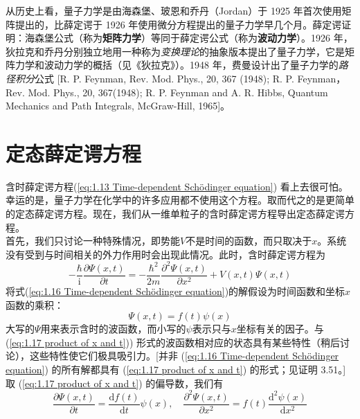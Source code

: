 	\indent 从历史上看，量子力学是由海森堡、玻恩和乔丹（Jordan）于 1925 年首次使用矩阵提出的，比薛定谔于 1926 年使用微分方程提出的量子力学早几个月。薛定谔证明：海森堡公式（称为\textbf{矩阵力学}）等同于薛定谔公式（称为\textbf{波动力学}）。1926 年，狄拉克和乔丹分别独立地用一种称为\textit{变换理论}的抽象版本提出了量子力学，它是矩阵力学和波动力学的概括（见《狄拉克》）。1948 年，费曼设计出了量子力学的\textit{路径积分}公式 [R. P. Feynman, Rev. Mod. Phys., 20, 367 (1948); R. P. Feynman，Rev. Mod. Phys., 20, 367(1948); R. P. Feynman and A. R. Hibbs, Quantum Mechanics and Path Integrals, McGraw-Hill, 1965]。
	
	\section{定态薛定谔方程}
	含时薛定谔方程(\ref{eq:1.13 Time-dependent Schödinger equation}) 看上去很可怕。幸运的是，量子力学在化学中的许多应用都不使用这个方程。取而代之的是更简单的定态薛定谔方程。现在，我们从一维单粒子的含时薛定谔方程导出定态薛定谔方程。\\
	\indent 首先，我们只讨论一种特殊情况，即势能$V$不是时间的函数，而只取决于$x$。系统没有受到与时间相关的外力作用时会出现此情况。此时，含时薛定谔方程为
	\begin{equation}
		-\frac{\hbar}{\mathrm{i}}\frac{\partial \Psi \left(x,t\right)}{\partial t}= -\frac{\hbar^2}{2m}\frac{\partial^2 \Psi \left(x,t\right)}{\partial x^2}+ V\left(x,t\right)\Psi\left(x,t\right)
		\label{eq:1.16 Time-dependent Schödinger equation}
	\end{equation}
	将式(\ref{eq:1.16 Time-dependent Schödinger equation})的解假设为时间函数和坐标$x$函数的乘积：
	\begin{equation}
		\boxed{\Psi\left(x,t\right)=f\left(t\right)\psi\left(x\right)}
		\label{eq:1.17 product of x and t}
	\end{equation}
	大写的$\Psi$用来表示含时的波函数，而小写的$\psi$表示只与$x$坐标有关的因子。与 (\ref{eq:1.17 product of x and t})) 形式的波函数相对应的状态具有某些特性（稍后讨论），这些特性使它们极具吸引力。[并非 (\ref{eq:1.16 Time-dependent Schödinger equation}) 的所有解都具有 (\ref{eq:1.17 product of x and t}) 的形式；见证明 3.51。]取 (\ref{eq:1.17 product of x and t}) 的偏导数，我们有
	\begin{equation*}
		\frac{\partial \Psi\left(x,t\right)}{\partial t} = \frac{\mathrm{d} f\left(t\right)}{\mathrm{d}t} \psi\left(x\right), \quad \frac{\partial^2 \Psi \left(x,t\right)}{\partial x^2}= f\left(t\right) \frac{\mathrm{d}^2\psi\left(x\right)}{\mathrm{d}x^2}
	\end{equation*}
